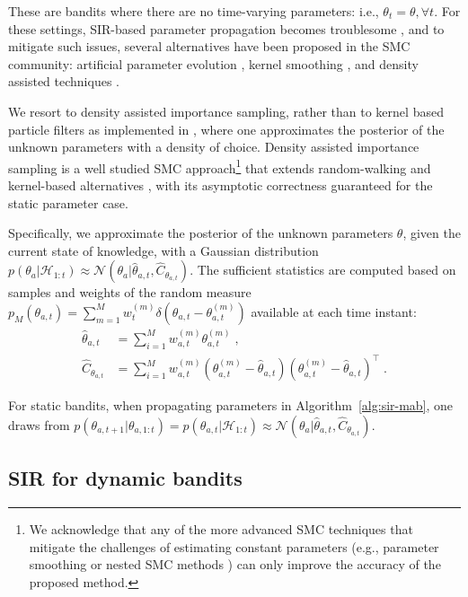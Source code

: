 \documentclass{article}
\newcommand{\HH}{\mathcal{H}}
\newcommand{\ie}{i.e., }
\newcommand{\eg}{e.g., }
\newcommand{\N}[1]{\mathcal{N}\left( #1\right)}
\begin{document}
These are bandits where there are no time-varying parameters: \ie $\theta_t=\theta, \forall t$. For these settings, SIR-based parameter propagation becomes troublesome \cite{b-Liu2001}, and to mitigate such issues, several alternatives have been proposed in the SMC community: artificial parameter evolution \cite{j-Gordon1993}, kernel smoothing \cite{b-Liu2001}, and density assisted techniques \cite{ip-Djuric2004}.

We resort to density assisted importance sampling, rather than to kernel based particle filters as implemented in \cite{j-Cherkassky2013}, where one approximates the posterior of the unknown parameters with a density of choice. Density assisted importance sampling is a well studied SMC approach\footnote{We acknowledge that any of the more advanced SMC techniques that mitigate the challenges of estimating constant parameters (\eg parameter smoothing \cite{j-Carvalho2010,j-Olsson2006,j-Olsson2014} or nested SMC methods \cite{j-Chopin2011,j-Crisan2013}) can only improve the accuracy of the proposed method.} that extends random-walking and kernel-based alternatives \cite{j-Gordon1993, ib-Liu2001, ip-Djuric2004}, with its asymptotic correctness guaranteed for the static parameter case.

Specifically, we approximate the posterior of the unknown parameters $\theta$, given the current state of knowledge, with a Gaussian distribution $p(\theta_a|\HH_{1:t}) \approx \N{\theta_a|\hat{\theta}_{a,t}, \hat{C}_{\theta_{a,t}}}$. The sufficient statistics are computed based on samples and weights of the random measure $p_M(\theta_{a,t})=\sum_{m=1}^M w_{t}^{(m)} \delta\left(\theta_{a,t}-\theta_{a,t}^{(m)}\right)$ available at each time instant:
\begin{equation}
\begin{split}
\hat{\theta}_{a,t} &= \sum_{i=1}^{M} w_{a,t}^{(m)} \theta^{(m)}_{a,t} \;,  \\
\hat{C}_{\theta_{a,t}} &= \sum_{i=1}^{M} w_{a,t}^{(m)}(\theta^{(m)}_{a,t} - \hat{\theta}_{a,t})(\theta^{(m)}_{a,t} - \hat{\theta}_{a,t})^\top \;.
\end{split}
\label{eq:proposedMethod_unknownAB_DA_estSuffStatistics}
\end{equation}

For static bandits, when propagating parameters in Algorithm~\ref{alg:sir-mab}, one draws from $p(\theta_{a,t+1}|\theta_{a,1:t})=p(\theta_{a,t}|\HH_{1:t}) \approx \N{\theta_a|\hat{\theta}_{a,t}, \hat{C}_{\theta_{a,t}}}$.

\subsection{SIR for dynamic bandits}
\label{ssec:linear_mixing_dynamics}
\end{document}
